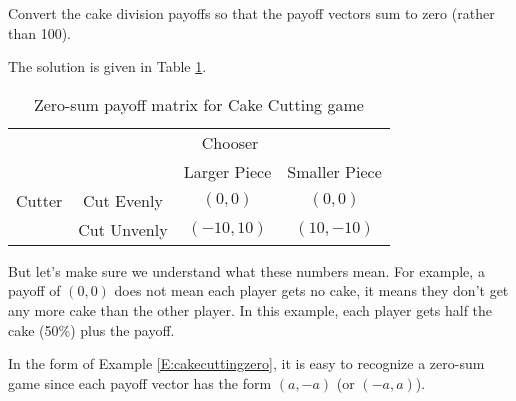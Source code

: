 \begin{example}\label{E:cakecuttingzero} Convert the cake division payoffs so that the payoff vectors sum to zero (rather than 100). 

The solution is given in Table \ref{T:cakecuttingzerosum}.

\begin{table}[h]
\centering

\begin{tabular}{cccc}
                      & \multicolumn{3}{c}{Chooser}                                                  \\ \cline{2-4} 
\multicolumn{1}{l|}{} & \multicolumn{1}{l|}{} & \multicolumn{1}{c|}{Larger Piece} & \multicolumn{1}{c|}{Smaller Piece} \\ \cline{2-4} 
\multicolumn{1}{l|}{Cutter} & \multicolumn{1}{c|}{Cut Evenly} & \multicolumn{1}{c|}{$(0, 0)$} & \multicolumn{1}{c|}{$(0, 0)$} \\ \cline{2-4} 
\multicolumn{1}{l|}{} & \multicolumn{1}{c|}{Cut Unvenly} & \multicolumn{1}{c|}{$(-10, 10)$} & \multicolumn{1}{c|}{$(10, -10)$} \\ \cline{2-4} 
\end{tabular}
\caption{Zero-sum payoff matrix for Cake Cutting game}
\label{T:cakecuttingzerosum}
\end{table}





But let's make sure we understand what these numbers mean. For example, a payoff of $(0,0)$ does not mean each player gets no cake, it means they don't get any more cake than the other player. In this example, each player gets half the cake (50\%) plus the payoff.
\end{example}

\bigskip

In the form of Example \ref{E:cakecuttingzero}, it is easy to recognize a zero-sum game since each payoff vector has the form $(a, -a)$ (or $(-a, a)$).

 